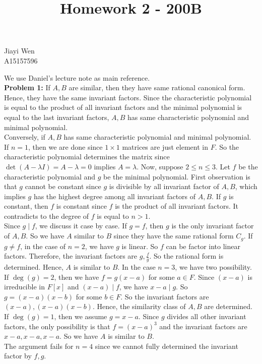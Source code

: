 \documentclass[12pt]{amsart}
\begin{document}
\title{Homework 2 - 200B}
\maketitle
\begin{center}
    Jiayi Wen\\
    A15157596
\end{center}
We use Daniel's lecture note as main reference.\\
\textbf{Problem 1:} If $A,B$ are similar, then they have same rational canonical form. Hence, they have the same invariant factors. Since the characteristic polynomial is equal to the product of all invariant factors and the minimal polynomial is equal to the last invariant factors, $A,B$ has same characteristic polynomial and minimal polynomial.\\
Conversely, if $A,B$ has same characteristic polynomial and minimal polynomial. If $n=1$, then we are done since $1\times 1$ matrices are just element in $F$. So the characteristic polynomial determines the matrix since $\det(A-\lambda I)=A-\lambda=0$ implies $A=\lambda$. Now, suppose $2\leq n\leq 3$. Let $f$ be the characteristic polynomial and $g$ be the minimal polynomial. First observation is that $g$ cannot be constant since $g$ is divisible by all invariant factor of $A,B$, which implies $g$ has the highest degree among all invariant factors of $A,B$. If $g$ is constant, then $f$ is constant since $f$ is the product of all invariant factors. It contradicts to the degree of $f$ is equal to $n>1$.\\ 
Since $g\mid f$, we discuss it case by case. If $g=f$, then $g$ is the only invariant factor of $A,B$. So we have $A$ similar to $B$ since they have the same rational form $C_g$. If $g\neq f$, in the case of $n=2$, we have $g$ is linear. So $f$ can be factor into linear factors. Therefore, the invariant factors are $g,\frac{f}{g}$. So the rational form is determined. Hence, $A$ is similar to $B$. In the case $n=3$, we have two possibility. If $\deg (g)=2$, then we have $f=g(x-a)$ for some $a\in F$. Since $(x-a)$ is irreducible in $F[x]$ and $(x-a)\mid f$, we have $x-a\mid g$. So $g=(x-a)(x-b)$ for some $b\in F$. So the invariant factors are $(x-a),(x-a)(x-b)$. Hence, the similarity class of $A,B$ are determined. If $\deg(g)=1$, then we assume $g=x-a$. Since $g$ divides all other invariant factors, the only possibility is that $f=(x-a)^3$ and the invariant factors are $x-a,x-a,x-a$. So we have $A$ is similar to $B$.\\
The argument fails for $n=4$ since we cannot fully determined the invariant factor by $f,g$.
\end{document}
